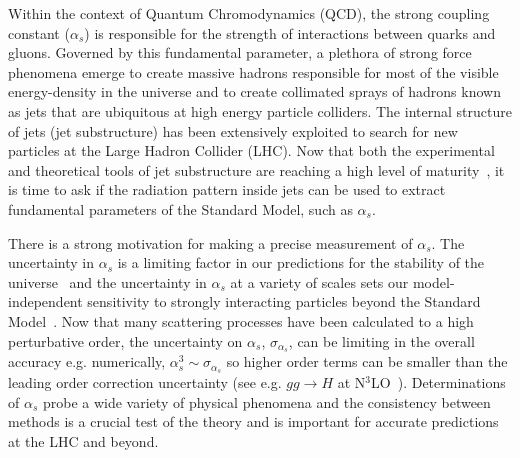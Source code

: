
Within the context of Quantum Chromodynamics (QCD), the strong coupling constant ($\alpha_s$) is responsible for the strength of interactions between quarks and gluons.  Governed by this fundamental parameter, a plethora of strong force phenomena emerge to create massive hadrons responsible for most of the visible energy-density in the universe and to create collimated sprays of hadrons known as jets that are ubiquitous at high energy particle colliders.  The internal structure of jets (jet substructure) has been extensively exploited to search for new particles at the Large Hadron Collider (LHC).  Now that both the experimental and theoretical tools of jet substructure are reaching a high level of maturity~\cite{Abdesselam:2010pt,Altheimer:2012mn,Altheimer:2013yza,Adams:2015hiv,Larkoski:2017jix}, it is time to ask if the radiation pattern inside jets can be used to extract fundamental parameters of the Standard Model, such as $\alpha_s$.

There is a strong motivation for making a precise measurement of $\alpha_s$.  The uncertainty in $\alpha_s$ is a limiting factor in our predictions for
the stability of the universe~\cite{Andreassen:2017rzq} and the
uncertainty in $\alpha_s$ at a variety of scales sets our
model-independent sensitivity to strongly interacting particles beyond
the Standard Model~\cite{Kaplan:2008pt,Becciolini:2014lya}.  Now that
many scattering processes have been calculated to a high perturbative
order, the uncertainty on $\alpha_s$, $\sigma_{\alpha_s}$, can be
limiting in the overall accuracy e.g. numerically,
$\alpha_s^3\sim \sigma_{\alpha_s}$ so higher order terms can be
smaller than the leading order correction uncertainty (see
e.g. $gg\rightarrow H$ at N$^3$LO~\cite{Anastasiou:2015ema}).  Determinations of $\alpha_s$
probe a wide variety of physical phenomena and the consistency between
methods is a crucial test of the theory and is important for accurate
predictions at the LHC and beyond.





